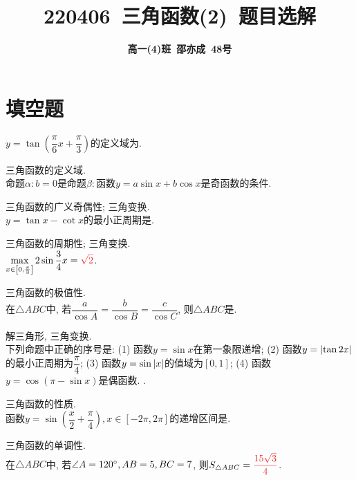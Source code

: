 \documentclass[8pt]{article}
\author{\normalfont\sffamily\large\bfseries{高一(4)班\ 邵亦成\ 48号}}
\title{\normalfont\sffamily\huge\bfseries{\textcolor{allanblue}{220406}\ \textcolor{allancyan}{三角函数(2)}\ 题目选解}}
\date{}
\begin{document}
	\maketitle

	\section{填空题}
		$y=\tan\left(\dfrac{\pi}{6}x+\dfrac{\pi}{3}\right)$的定义域为.
		
		三角函数的定义域.
		~\\

		命题$\alpha: b=0$是命题$\beta:$函数$y=a\sin x+b\cos x$是奇函数的条件.
		
		三角函数的广义奇偶性; 三角变换.
		~\\

		$y=\tan x-\cot x$的最小正周期是.
		
		三角函数的周期性; 三角变换.
		~\\

		$\displaystyle \max_{x\in\left[0, \frac{\pi}{3}\right]} 2\sin\dfrac{3}{4}x=\ansmath{\sqrt{2}}$.
		
		三角函数的极值性.
		~\\

		在$\triangle ABC$中, 若$\dfrac{a}{\cos A}=\dfrac{b}{\cos B}=\dfrac{c}{\cos C}$, 则$\triangle ABC$是.
		
		解三角形, 三角变换.
		~\\

		下列命题中正确的序号是: (1) 函数$y=\sin x$在第一象限递增; (2) 函数$y=\left\lvert \tan 2x \right\rvert$的最小正周期为$\dfrac{\pi}{4}$; (3) 函数$y=\sin\left\lvert x \right\rvert$的值域为$[0, 1]$; (4) 函数$y=\cos \left(\pi - \sin x\right)$是偶函数. .
		
		三角函数的性质.
		~\\
		
		函数$y=\sin\left(\dfrac{x}{2}+\dfrac{\pi}{4}\right), x\in \left[-2\pi, 2\pi\right]$的递增区间是.
		
		三角函数的单调性.
		~\\

		在$\triangle ABC$中, 若$\angle A=120^\circ, AB=5, BC=7$, 则$S_{\triangle ABC}=\ansmath{\dfrac{15\sqrt{3}}{4}}$.
		
\end{document}
